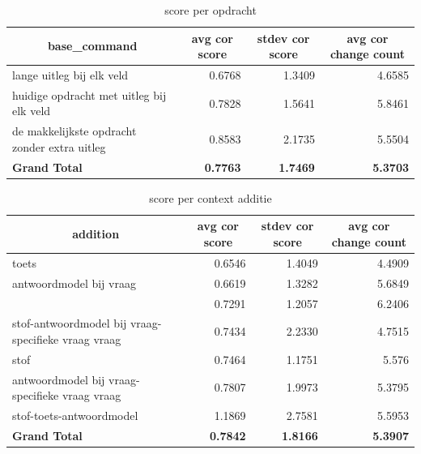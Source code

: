 \documentclass[12pt]{article}
\begin{document}
\noindent\begin{table}[H]
\caption{score per opdracht}
\label{fig:score-command}
\begin{tabularx}{\textwidth}{X *3{r}}
    \toprule
    \multicolumn{1}{c}{\textbf{base\_command}} & \multicolumn{1}{c}{\textbf{avg cor score}} & \multicolumn{1}{c}{\textbf{stdev cor score}} & \multicolumn{1}{c}{\textbf{avg cor change count}} \\
    \midrule
    lange uitleg bij elk veld & 0.6768 & 1.3409 & 4.6585 \\
    huidige opdracht met uitleg bij elk veld & 0.7828 & 1.5641 & 5.8461 \\
    de makkelijkste opdracht zonder extra uitleg & 0.8583 & 2.1735 & 5.5504 \\
    \midrule
    \textbf{Grand Total} & \textbf{0.7763} & \textbf{1.7469} & \textbf{5.3703} \\
    \bottomrule
\end{tabularx}%
\end{table}


\noindent\begin{table}[H]
\caption{score per context additie}
\label{fig:score-addition}
\begin{tabularx}{\textwidth}{X *3{r}}
    \toprule
    \multicolumn{1}{c}{\textbf{addition}} & \multicolumn{1}{c}{\textbf{avg cor score}} & \multicolumn{1}{c}{\textbf{stdev cor score}} & \multicolumn{1}{c}{\textbf{avg cor change count}} \\
    \midrule
    toets & 0.6546 & 1.4049 & 4.4909 \\
    antwoordmodel bij vraag & 0.6619 & 1.3282 & 5.6849 \\
    & 0.7291 & 1.2057 & 6.2406 \\
    stof-antwoordmodel bij vraag-specifieke vraag vraag & 0.7434 & 2.2330 & 4.7515 \\
    stof & 0.7464 & 1.1751 & 5.576 \\
    antwoordmodel bij vraag-specifieke vraag vraag & 0.7807 & 1.9973 & 5.3795 \\
    stof-toets-antwoordmodel & 1.1869 & 2.7581 & 5.5953 \\
    \midrule
    \textbf{Grand Total} & \textbf{0.7842} & \textbf{1.8166} & \textbf{5.3907} \\
    \bottomrule
\end{tabularx}%
\end{table}
\end{document}
